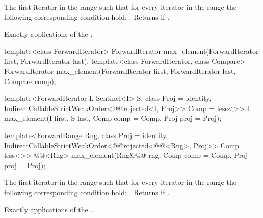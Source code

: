 \begin{itemdescr}
\pnum
\returns
The first iterator
in the range
such that for every iterator
in the range
the following corresponding condition hold:
.
Returns
if
.

\pnum
\complexity
Exactly
applications of the .
\end{itemdescr}

%
\begin{removedblock}
\begin{itemdecl}
template<class ForwardIterator>
  ForwardIterator max_element(ForwardIterator first, ForwardIterator last);
template<class ForwardIterator, class Compare>
  ForwardIterator max_element(ForwardIterator first, ForwardIterator last,
                            Compare comp);
\end{itemdecl}
\end{removedblock}
\begin{addedblock}
\begin{itemdecl}
template<ForwardIterator I, Sentinel<I> S, class Proj = identity,
    IndirectCallableStrictWeakOrder<@@rojected<I, Proj>> Comp = less<>>
  I max_element(I first, S last, Comp comp = Comp{}, Proj proj = Proj{});

template<ForwardRange Rng, class Proj = identity,
    IndirectCallableStrictWeakOrder<@@rojected<@@<Rng>, Proj>> Comp = less<>>
  @@<Rng>
    max_element(Rng&@\newtxt{\&}@ rng, Comp comp = Comp{}, Proj proj = Proj{});
\end{itemdecl}
\end{addedblock}

\begin{itemdescr}
\pnum
\returns
The first iterator
in the range
such that for every iterator
in the range
the following corresponding condition hold:
.
Returns
if
.

\pnum
\complexity
Exactly
applications of the .
\end{itemdescr}

